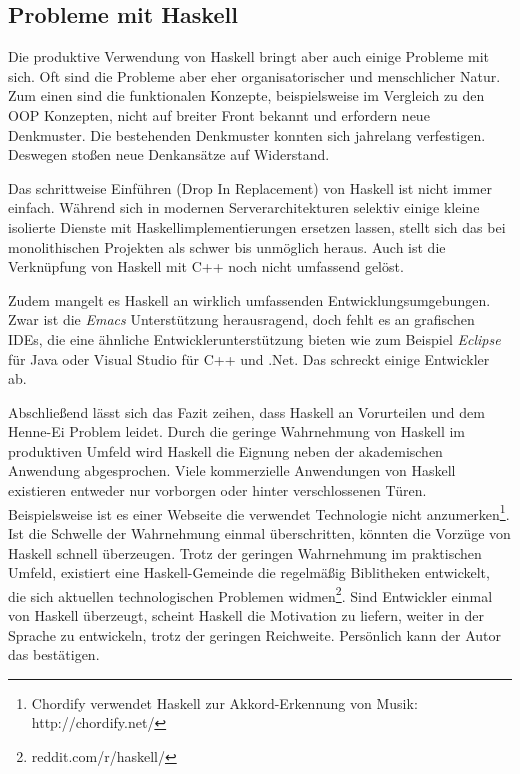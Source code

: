 \subsection{Probleme mit Haskell}\label{sec:probleme-haskell}

Die produktive Verwendung von Haskell bringt aber auch einige Probleme mit sich. Oft sind die Probleme aber eher organisatorischer und menschlicher Natur. Zum einen sind die funktionalen Konzepte, beispielsweise im Vergleich zu den OOP Konzepten, nicht auf breiter Front bekannt und erfordern neue Denkmuster. Die bestehenden Denkmuster konnten sich jahrelang verfestigen. Deswegen stoßen neue Denkansätze auf Widerstand.

Das schrittweise Einführen (Drop In Replacement) von Haskell ist nicht immer einfach. Während sich in modernen Serverarchitekturen selektiv einige kleine isolierte Dienste mit Haskellimplementierungen ersetzen lassen, stellt sich das bei monolithischen Projekten als schwer bis unmöglich heraus. Auch ist die Verknüpfung von Haskell mit C++ noch nicht umfassend gelöst.

Zudem mangelt es Haskell an wirklich umfassenden Entwicklungsumgebungen. Zwar ist die \textit{Emacs} Unterstützung herausragend, doch fehlt es an grafischen \ac{IDE}s, die eine ähnliche Entwicklerunterstützung bieten wie zum Beispiel \textit{Eclipse} für Java oder {Visual Studio} für C++ und .Net. Das schreckt einige Entwickler ab.

Abschließend lässt sich das Fazit zeihen, dass Haskell an Vorurteilen und dem Henne-Ei Problem leidet. Durch die geringe Wahrnehmung von Haskell im produktiven Umfeld wird Haskell die Eignung neben der akademischen Anwendung abgesprochen. Viele kommerzielle Anwendungen von Haskell existieren entweder nur vorborgen oder hinter verschlossenen Türen. Beispielsweise ist es einer Webseite die verwendet Technologie nicht anzumerken\footnote{Chordify verwendet Haskell zur Akkord-Erkennung von Musik: http://chordify.net/}. Ist die Schwelle der Wahrnehmung einmal überschritten, könnten die Vorzüge von Haskell schnell überzeugen. Trotz der geringen Wahrnehmung im praktischen Umfeld, existiert eine Haskell-Gemeinde die regelmäßig Biblitheken entwickelt, die sich aktuellen technologischen Problemen widmen\footnote{reddit.com/r/haskell/}. Sind Entwickler einmal von Haskell überzeugt, scheint Haskell die Motivation zu liefern, weiter in der Sprache zu entwickeln, trotz der geringen Reichweite. Persönlich kann der Autor das bestätigen.
